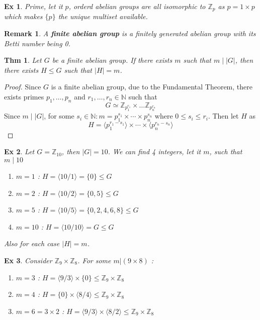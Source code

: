 \documentclass[paper=a4, fontsize=11pt]{scrartcl}
\newcommand{\Zn}[1]{\mathbb{Z}_{#1}}
\newtheorem{theorem}{Thm}
\newtheorem{example}{Ex}
\newtheorem*{remark}{Remark}
\begin{document}
\begin{example}
	Prime, let it $p$, orderd abelian groups are all isomorphic to $\Zn{p}$ as $p=1\times p$ which makes $\{p\}$ the unique multiset available.\\
\end{example}

\begin{remark}
	A \textbf{finite abelian group} is a finitely generated abelian group with its Betti number being 0.\\
\end{remark}

\begin{theorem}
	Let $G$ be a finite abelian group. If there exists $m$ such that $m \mid |G|$, then there exists $H \leqslant G$ such that $|H|=m$.
\end{theorem}

\begin{proof}
	Since $G$ is a finite abelian group, due to the Fundamental Theorem, there exists primes $p_1,\dots,p_n$ and $r_1,\dots,r_n \in \mathbb{N}$ such that
	\begin{equation}\nonumber
		G \simeq \Zn{p_1^{r_1}}  \times \dots \Zn{p_n ^{r_n}}
	\end{equation}
	Since $m \mid |G|$, for some $s_i \in \mathbb{N} :  m = p_1^{s_1}\times \cdots \times p_n^{s_n}$ where $0 \leq s_i \leq r_i$. Then let $H$ as 
	\begin{equation}\nonumber
		H = \langle p_1 ^{r_1 - s_1} \rangle \times \cdots \times \langle p_n ^{r_n - s_n} \rangle
	\end{equation}
\end{proof}

\begin{example}
Let $G=\Zn{10}$, then $|G| = 10$. We can find 4 integers, let it $m$, such that $m \mid 10$
\begin{enumerate}
	\item $m=1$ : $H=\langle 10/1 \rangle = \{0\} \leqslant G$ 
	\item $m=2$ : $H=\langle 10/2 \rangle = \{0,5\} \leqslant G$
	\item $m=5$ : $H=\langle 10/5 \rangle = \{0,2,4,6,8\} \leqslant G$
	\item $m=10$ : $H=\langle 10/10 \rangle = G \leqslant G$
\end{enumerate}
Also for each case $|H|=m$.\\
\end{example}

\begin{example}
	Consider $\Zn{9} \times \Zn{8}$. For some $m | (9\times 8)$ :
	\begin{enumerate}
		\item $m=3$ : $H=\langle 9/3\rangle \times \{0\} \leqslant \Zn{9} \times \Zn{8}$
		\item $m=4$ : $H= \{0\}\times \langle 8/4\rangle\leqslant \Zn{9} \times \Zn{8}$ 
		\item $m=6=3\times 2$ : $H= \langle 9/3\rangle\times \langle 8/2\rangle\leqslant \Zn{9} \times \Zn{8}$ 
	\end{enumerate}
\end{example}
\end{document}
